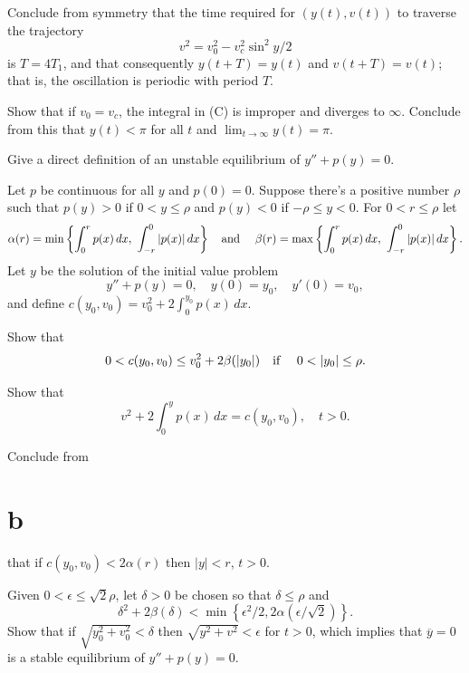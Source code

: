 \begin{exerciselist}
\begin{alist}
    \item %
    Conclude from symmetry that the time required for $(y(t),v(t))$ to traverse the trajectory
    \[
      v^{2}=v_{0}^{2}-v_{c}^{2}\sin^{2}y/2
    \]
    is $T=4T_{1}$, and that consequently $y(t+T)=y(t)$ and $v(t+T)=v(t)$; that is, the oscillation is periodic with period $T$.

    \item %
    Show that if $v_{0}=v_{c}$, the integral in (C) is improper and diverges to $\infty$. Conclude from this that $y(t)<\pi$ for all $t$ and $\lim_{t\to\infty}y(t)=\pi$.
  \end{alist}

  \item\label{exer:4.4.22} Give a direct definition of an unstable equilibrium of $y''+p(y)=0$.

  \item\label{exer:4.4.23} Let $p$ be continuous for all $y$ and $p(0)=0$. Suppose there's a positive number $\rho$ such that $p(y)>0$ if $0<y\le\rho$ and $p(y)<0$ if $-\rho\le y<0$. For $0<r\le\rho$ let
  \[
    \alpha(r)=\min\left\{\int_{0}^{r}p(x)\,dx,\ \int_{-r}^{0}|p(x)|\,dx\right\} \mbox{\quad and \quad}\beta(r)=\max\left\{\int_{0}^{r}p(x)\,dx,\ \int_{-r}^{0}|p(x)|\,dx\right\}.
  \]
  Let $y$ be the solution of the initial value problem
  \[
    y''+p(y)=0,\quad y(0)=y_{0},\quad y'(0)=v_{0},
  \]
  and define $c(y_{0},v_{0})=v_{0}^{2}+2\int_{0}^{y_{0}}p(x)\,dx$.
  \begin{alist}
    \item %
    Show that
    \[
      0<c(y_{0},v_{0}) \le v_{0}^{2}+2\beta(|y_{0}|)\mbox{\quad if \quad}0<|y_{0}|\le\rho.
    \]

    \item %
    Show that
    \[
      v^{2}+2\int_{0}^{y}p(x)\,dx=c(y_{0},v_{0}),\quad t>0.
    \]

    \item %
    Conclude from \part{b} that if $c(y_{0},v_{0})<2\alpha(r)$ then $|y|<r$, $t>0$.

    \item %
    Given $0<\epsilon\le\sqrt{2}\rho$, let $\delta>0$ be chosen so that $\delta\le\rho$ and
    \[
      \delta^{2}+2\beta(\delta)<\min\left\{\epsilon^{2}/2,2\alpha(\epsilon/\sqrt{2}) \right\}.
    \]
    Show that if $\sqrt{y_{0}^{2}+v_{0}^{2}}<\delta$ then $\sqrt{y^{2}+v^{2}}<\epsilon$ for $t>0$, which implies that $\overline{y}=0$ is a stable equilibrium of $y''+p(y)=0$.


\end{alist}
\end{exerciselist}
